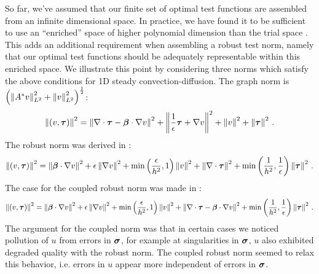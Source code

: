 \documentclass{article}
\theoremstyle{definition}
\theoremstyle{remark}
\begin{document}
So far, we've assumed that our finite set of optimal test functions are assembled from an infinite dimensional space.
In practice, we have found it to be sufficient to use an ``enriched'' space of higher
polynomial dimension than the trial space \cite{PracticalDPG}.
This adds an additional requirement when assembling a robust test norm, namely that our optimal test functions should be adequately representable within this enriched space.
We illustrate this point by considering three norms which satisfy the above conditions for 1D steady convection-diffusion.
The graph norm is $\left( \left\| A^*v \right\|_{L^2}^2+\left\| v \right\|_{L^2}^2 \right)^{\frac{1}{2}}$:
\begin{equation*}
\left\| (v,\boldsymbol\tau) \right\|^2=
\left\| \nabla\cdot\boldsymbol\tau-\boldsymbol\beta\cdot\nabla v \right\|^2
+\left\| \frac{1}{\epsilon}\boldsymbol\tau+\nabla v \right\|^2
+\left\| v \right\|^2
+\left\| \boldsymbol\tau \right\|^2\,.
\end{equation*}
The robust norm was derived in \cite{ChanHeuerThanhDemkowicz2012}:
\begin{equation*}
\left\| (v,\boldsymbol\tau) \right\|^2=
\left\| \boldsymbol\beta\cdot\nabla v \right\|^2
+\epsilon\left\| \nabla v \right\|^2
+\min\left( \frac{\epsilon}{h^2},1 \right)\left\| v \right\|^2
+\left\| \nabla\cdot\boldsymbol\tau \right\|^2
+\min\left( \frac{1}{h^2},\frac{1}{\epsilon} \right)\left\| \boldsymbol\tau \right\|^2\,.
\end{equation*}
The case for the coupled robust norm was made in \cite{JesseDissertation}:
\begin{equation*}
\left\| (v,\boldsymbol\tau) \right\|^2=
\left\| \boldsymbol\beta\cdot\nabla v \right\|^2
+\epsilon\left\| \nabla v \right\|^2
+\min\left( \frac{\epsilon}{h^2},1 \right)\left\| v \right\|^2
+\left\| \nabla\cdot\boldsymbol\tau-\boldsymbol\beta\cdot\nabla v \right\|^2
+\min\left( \frac{1}{h^2},\frac{1}{\epsilon} \right)\left\| \boldsymbol\tau \right\|^2\,.
\end{equation*}
The argument for the coupled norm was that in certain cases we noticed pollution of $u$ from errors in $\boldsymbol\sigma$,
for example at singularities in $\boldsymbol\sigma$, $u$ also exhibited degraded quality with the robust norm. 
The coupled robust norm seemed to relax this behavior, i.e. errors in $u$ appear more independent of errors in $\boldsymbol\sigma$.
\end{document}
